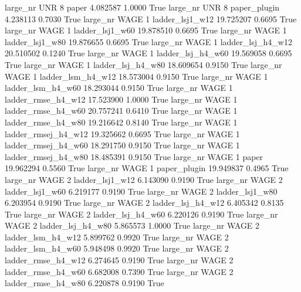   large_nr      UNR                 8               paper    4.082587      1.0000    True
  large_nr      UNR                 8        paper_plugin    4.238113      0.7030    True
  large_nr     WAGE                 1     ladder_lsj1_w12   19.725207      0.6695    True
  large_nr     WAGE                 1     ladder_lsj1_w60   19.878510      0.6695    True
  large_nr     WAGE                 1     ladder_lsj1_w80   19.876655      0.6695    True
  large_nr     WAGE                 1   ladder_lsj_h4_w12   20.510502      0.1240    True
  large_nr     WAGE                 1   ladder_lsj_h4_w60   19.569058      0.6695    True
  large_nr     WAGE                 1   ladder_lsj_h4_w80   18.609654      0.9150    True
  large_nr     WAGE                 1   ladder_lsm_h4_w12   18.573004      0.9150    True
  large_nr     WAGE                 1   ladder_lsm_h4_w60   18.293044      0.9150    True
  large_nr     WAGE                 1  ladder_rmse_h4_w12   17.523900      1.0000    True
  large_nr     WAGE                 1  ladder_rmse_h4_w60   20.757241      0.6410    True
  large_nr     WAGE                 1  ladder_rmse_h4_w80   19.216642      0.8140    True
  large_nr     WAGE                 1 ladder_rmsej_h4_w12   19.325662      0.6695    True
  large_nr     WAGE                 1 ladder_rmsej_h4_w60   18.291750      0.9150    True
  large_nr     WAGE                 1 ladder_rmsej_h4_w80   18.485391      0.9150    True
  large_nr     WAGE                 1               paper   19.962294      0.5560    True
  large_nr     WAGE                 1        paper_plugin   19.949837      0.4965    True
  large_nr     WAGE                 2     ladder_lsj1_w12    6.143090      0.9190    True
  large_nr     WAGE                 2     ladder_lsj1_w60    6.219177      0.9190    True
  large_nr     WAGE                 2     ladder_lsj1_w80    6.203954      0.9190    True
  large_nr     WAGE                 2   ladder_lsj_h4_w12    6.405342      0.8135    True
  large_nr     WAGE                 2   ladder_lsj_h4_w60    6.220126      0.9190    True
  large_nr     WAGE                 2   ladder_lsj_h4_w80    5.865573      1.0000    True
  large_nr     WAGE                 2   ladder_lsm_h4_w12    5.899762      0.9920    True
  large_nr     WAGE                 2   ladder_lsm_h4_w60    5.948498      0.9920    True
  large_nr     WAGE                 2  ladder_rmse_h4_w12    6.274645      0.9190    True
  large_nr     WAGE                 2  ladder_rmse_h4_w60    6.682008      0.7390    True
  large_nr     WAGE                 2  ladder_rmse_h4_w80    6.220878      0.9190    True
